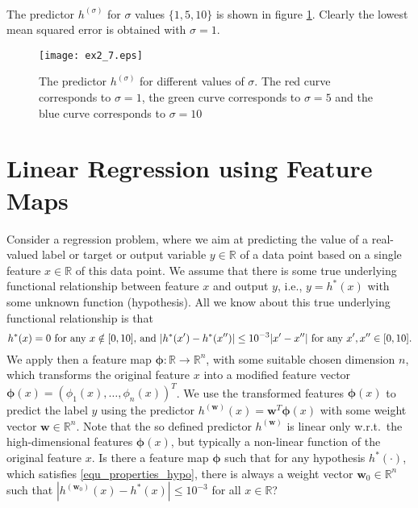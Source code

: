 \documentclass[article,11pt]{article}
\begin{document}
\\
The predictor $h^{(\sigma)}$ for $\sigma$ values $\{1,5,10\}$ is shown in figure
\ref{fig:kernelregression}. Clearly the lowest mean squared error is obtained
with $\sigma=1$.
\begin{figure}[!h]
  \centering
  \texttt{[image: ex2\_7.eps]}
  \caption{The predictor $h^{(\sigma)}$ for different values of $\sigma$. The red
    curve corresponds to $\sigma=1$, the green curve corresponds to
    $\sigma=5$ and the blue curve corresponds to $\sigma=10$}
  \label{fig:kernelregression}
\end{figure}

\newpage
\section{Linear Regression using Feature Maps}
Consider a regression problem, where we aim at predicting the value of a real-valued label or target or output variable $y \in \mathbb{R}$ of a data point 
based on a single feature $x \in \mathbb{R}$ of this data point. We assume that there is some true underlying functional relationship between 
feature $x$ and output $y$, i.e., $y =h^{*}(x)$ with some unknown function (hypothesis). All we know about this true underlying functional relationship is 
that 
\vspace*{-2mm}
\begin{equation}
\label{equ_properties_hypo}
h^{*}(x) = 0 \mbox{ for any } x \notin [0,10]  \mbox{, and } |h^{*}(x') -h^{*}(x'')| \leq 10^{-3} |x'-x''| \mbox{ for any } x',x'' \in[0,10]. 
\vspace*{-2mm}
\end{equation}
We apply then a feature map ${\bm \phi}: \mathbb{R} \rightarrow \mathbb{R}^{n}$, with some suitable chosen dimension $n$, which transforms 
the original feature $x$ into a modified feature vector ${\bm \phi}(x)=(\phi_{1}(x),\ldots,\phi_{n}(x))^{T}$. We use the transformed features 
${\bm \phi}(x)$ to predict the label $y$ using the predictor $h^{(\mathbf{w})}(x) = \mathbf{w}^{T} {\bm \phi}(x)$ with some weight vector $\mathbf{w}\in \mathbb{R}^{n}$. 
Note that the so defined predictor $h^{(\mathbf{w})}$ is linear only w.r.t.\ the high-dimensional features ${\bm \phi}(x)$, but typically 
a non-linear function of the original feature $x$. Is there a feature map ${\bm \phi}$ such that for any hypothesis $h^{*}(\cdot)$, which satisfies \eqref{equ_properties_hypo}, 
there is always a weight vector $\mathbf{w}_{0} \in \mathbb{R}^{n}$ such that $|h^{(\mathbf{w}_{0})}(x) - h^{*}(x)| \leq 10^{-3}$ for all $x \in \mathbb{R}$?

\end{document}
